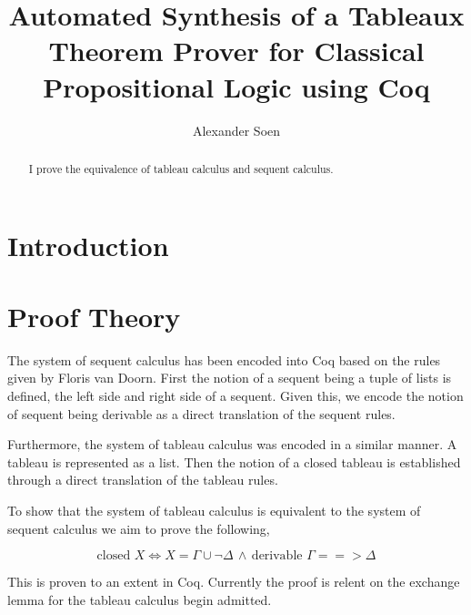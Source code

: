 \documentclass{report}
\title{ Automated Synthesis of a Tableaux Theorem Prover for Classical
Propositional Logic using Coq}
\author{Alexander Soen}
\begin{document}
\begin{abstract}
I prove the equivalence of tableau calculus and sequent calculus.
\end{abstract}

\section{Introduction}

\section{Proof Theory}

The system of sequent calculus has been encoded into Coq based on the rules
given by Floris van Doorn. First the notion of a sequent being a tuple of lists
is defined, the left side and right side of a sequent. Given this, we encode
the notion of sequent being derivable as a direct translation of the sequent
rules.

\par

Furthermore, the system of tableau calculus was encoded in a similar manner.
A tableau is represented as a list. Then the notion of a closed tableau is
established through a direct translation of the tableau rules.

\par

To show that the system of tableau calculus is equivalent to the system of
sequent calculus we aim to prove the following,

\begin{equation}
\text{closed }X \iff X=\Gamma \cup \neg \Delta \, \wedge \, \text{derivable }
\Gamma ==> \Delta
\label{tableau sequent equivalence}
\end{equation}

This is proven to an extent in Coq. Currently the proof is relent on the
exchange lemma for the tableau calculus begin admitted.

\par
\end{document}
